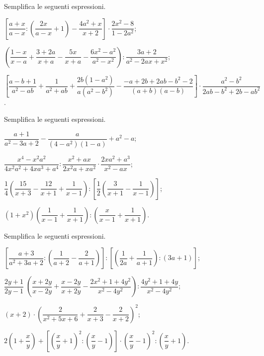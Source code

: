 \begin{esercizio}[\Ast]
\label{ese:14.57}
Semplifica le seguenti espressioni.
\begin{enumeratea}
 \item $\left[\dfrac{a+x}{a-x}:\left(\dfrac{2x}{a-x}+1\right)-\dfrac{4a^{2}+x}{x+2}\right]\cdot {\dfrac{2x^{2}-8}{1-2a^{2}}}$;
 \item $\left(\dfrac{1-x}{x-a}+\dfrac{3+2a}{x+a}-\dfrac{5x}{x+a}-\dfrac{6x^{2}-a^{2}}{a^{2}-x^{2}}\right):\dfrac{3a+2}{a^{2}-2ax+x^{2}}$;
 \item $\left[\dfrac{a-b+1}{a^{2}-ab}+\dfrac{1}{a^{2}+ab}+\dfrac{2b\left(1-a^{2}\right)}{a\left(a^{2}-b^{2}\right)}-\dfrac{-a+2b+2ab-b^2-2}{(a+b)(a-b)}\right]\cdot {\dfrac{a^{2}-b^{2}}{2ab-b^{2}+2b-ab^{2}}}$.
\end{enumeratea}
\end{esercizio}

\begin{esercizio}[\Ast]
\label{ese:14.58}
Semplifica le seguenti espressioni.
\begin{enumeratea}
 \item $\dfrac{a+1}{a^{2}-3a+2}-\dfrac{a}{(4-a^{2})(1-a)}+a^{2}-a$;
 \item $\dfrac{x^{4}-x^{2}a^{2}}{4x^{2}a^{2}+4xa^{3}+a^{4}}:\dfrac{x^{2}+ax}{2x^{2}a+xa^{2}}\cdot {\dfrac{2xa^{2}+a^{3}}{x^{2}-ax}}$;
 \item $\dfrac{1}{4}\left(\dfrac{15}{x+3}-\dfrac{12}{x+1}+\dfrac{1}{x-1}\right):\left[\dfrac{1}{2}\left(\dfrac{3}{x+1}-\dfrac{1}{x-1}\right)\right]$;
 \item $\left(1+x^{2}\right)\left(\dfrac{1}{x-1}+\dfrac{1}{x+1}\right):\left(\dfrac{x}{x-1}+\dfrac{1}{x+1}\right)$.
\end{enumeratea}
\end{esercizio}

\begin{esercizio}[\Ast]
\label{ese:14.59}
Semplifica le seguenti espressioni.
\begin{enumeratea}
 \item $\left[\dfrac{a+3}{a^{2}+3a+2}:\left(\dfrac{1}{a+2}-\dfrac{2}{a+1}\right)\right]:\left[\left(\dfrac{1}{2a}+\dfrac{1}{a+1}\right):(3a+1)\right]$;
 \item $\dfrac{2y+1}{2y-1}\;\left(\dfrac{x+2y}{x-2y}+\dfrac{x-2y}{x+2y}-\dfrac{2x^{2}+1+4y^{2}}{x^{2}-4y^{2}}\right):\dfrac{4y^{2}+1+4y}{x^{2}-4y^{2}}$;
 \item $(x+2)\cdot \left(\dfrac{2}{x^{2}+5x+6}+\dfrac{2}{x+3}-\dfrac{2}{x+2}\right)^{2}$;
 \item $2\left(1+\dfrac{x}{y}\right)+\left[\left(\dfrac{x}{y}+1\right)^{2}:\left(\dfrac{x}{y}-1\right)\right]\cdot \left(\dfrac{x}{y}-1\right)^{2}:\left(\dfrac{x}{y}+1\right)$.
\end{enumeratea}
\end{esercizio}

